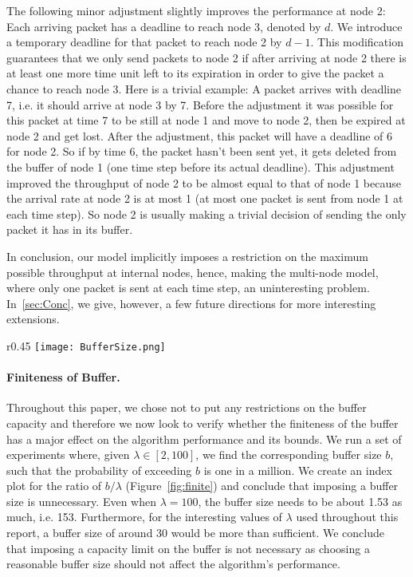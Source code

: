 \documentclass[oribibl]{llncs}
\begin{document}
The following minor adjustment slightly improves the performance at
node 2: Each arriving packet has a deadline to reach node 3, denoted
by $d$. We introduce a temporary deadline for that packet to reach
node 2 by $d-1$. This modification guarantees that we only send packets to
node 2 if after arriving at node 2 there is at least one more time
unit left to its expiration in order to give the packet a chance to
reach node 3. Here is a trivial example: A packet arrives with
deadline 7, i.e. it should arrive at node 3 by 7. Before the
adjustment it was possible for this packet at time 7 to be still at
node 1 and move to node 2, then be expired at node 2 and get
lost. After the adjustment, this packet will have a deadline of 6 for
node 2. So if by time 6, the packet hasn't been sent yet, it gets
deleted from the buffer of node 1 (one time step before its actual
deadline). This adjustment improved the throughput of node 2 to be
almost equal to that of node 1 because the arrival rate at node 2 is
at most 1 (at most one packet is sent from node 1 at each time
step). So node 2 is usually making a trivial decision of sending the
only packet it has in its buffer.

In conclusion, our model
implicitly imposes a restriction on the maximum possible throughput at internal
nodes, hence, making the multi-node model, where only one packet is
sent at each time step, an uninteresting problem. In~\ref{sec:Conc}, we give, however, a few future directions for more interesting extensions.


\begin{wrapfigure}[10]{r}{0.45\textwidth}
\vspace{-20pt}
\texttt{[image: BufferSize.png]}
\caption{ $b/\lambda$ vs. $\lambda$}
\label{fig:finite}
\end{wrapfigure}

\paragraph{Finiteness of Buffer.} Throughout this paper, we chose not to put any restrictions on the buffer capacity and therefore we now look to verify whether the finiteness of the buffer has a major effect on the algorithm performance and its bounds. We run a set of experiments where, given $\lambda \in [2, 100]$, we find the corresponding buffer size $b$, such that the probability of exceeding $b$ is one in a million. We create an index plot for the ratio of $b/ \lambda$ (Figure~\ref{fig:finite}) and conclude that imposing a buffer size is unnecessary. Even when $\lambda = 100$, the buffer size needs to be about 1.53 as much, i.e. 153.  Furthermore, for the interesting values of $\lambda$ used throughout this report, a buffer size of around 30 would be more than sufficient. We conclude that imposing a capacity limit on the buffer is not necessary as choosing a
reasonable buffer size should not affect the algorithm's
performance.
\end{document}
